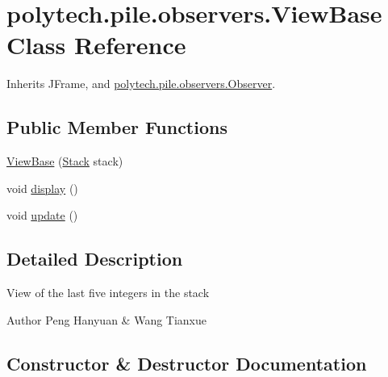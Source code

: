 \hypertarget{classpolytech_1_1pile_1_1observers_1_1_view_base}{}\section{polytech.\+pile.\+observers.\+View\+Base Class Reference}
\label{classpolytech_1_1pile_1_1observers_1_1_view_base}


Inherits J\+Frame, and \hyperlink{interfacepolytech_1_1pile_1_1observers_1_1_observer}{polytech.\+pile.\+observers.\+Observer}.

\subsection*{Public Member Functions}
\begin{DoxyCompactItemize}
\item 
\hyperlink{classpolytech_1_1pile_1_1observers_1_1_view_base_a5357762eda9fc45c8d955de47dedb4a7}{View\+Base} (\hyperlink{classpolytech_1_1pile_1_1subject_1_1_stack}{Stack} stack)
\item 
void \hyperlink{classpolytech_1_1pile_1_1observers_1_1_view_base_a2f57cb278c30ac5971a977651f7e85e4}{display} ()
\item 
void \hyperlink{classpolytech_1_1pile_1_1observers_1_1_view_base_a1a3c482d6c7d84c19abd52e0b8ee217d}{update} ()
\end{DoxyCompactItemize}


\subsection{Detailed Description}
View of the last five integers in the stack

\begin{DoxyAuthor}{Author}
Peng Hanyuan \& Wang Tianxue 
\end{DoxyAuthor}


\subsection{Constructor \& Destructor Documentation}
\hypertarget{classpolytech_1_1pile_1_1observers_1_1_view_base_a5357762eda9fc45c8d955de47dedb4a7}{}\label{classpolytech_1_1pile_1_1observers_1_1_view_base_a5357762eda9fc45c8d955de47dedb4a7} 
